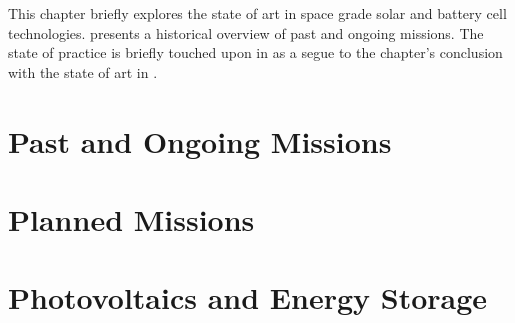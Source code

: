 This chapter briefly explores the state of art in space grade solar and battery cell technologies.  presents a historical overview of past and ongoing missions. The state of practice is briefly touched upon in  as a segue to the chapter's conclusion with the state of art in .

\section{Past and Ongoing Missions}
\label{sec:StateOfTheArt:PastAndOngoingMissions}


\clearpage
\section{Planned Missions}
\label{sec:StateOfTheArt:PlannedMissions}


\clearpage
\section{Photovoltaics and Energy Storage}
\label{sec:StateOfTheArt:PhotovoltaicsAndEnergyStorage}


